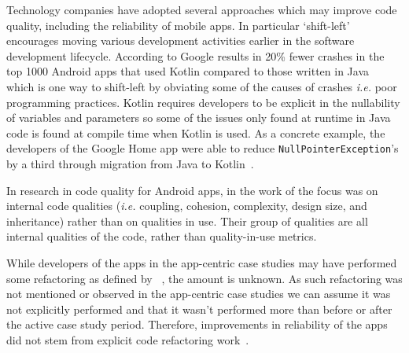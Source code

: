 Technology companies have adopted several approaches which may improve code quality, including the reliability of mobile apps. In particular `shift-left'~ encourages moving various development activities earlier in the software development lifecycle. According to Google  results in 20\% fewer crashes in the top 1000 Android apps that used Kotlin compared to those written in Java~ which is one way to shift-left by obviating some of the causes of crashes \emph{i.e.} poor programming practices. Kotlin requires developers to be explicit in the nullability of variables and parameters so some of the issues only found at runtime in Java code is found at compile time when Kotlin is used. As a concrete example, the developers of the Google Home app were able to reduce \texttt{NullPointerException}'s by a third through migration from Java to Kotlin~.


In research in code quality for Android apps, in the work of  the focus was on internal code qualities (\emph{i.e.} coupling, cohesion, complexity, design size, and inheritance) rather than on qualities in use. Their group of qualities are all internal qualities of the code, rather than quality-in-use metrics. 

While developers of the apps in the app-centric case studies may have performed some refactoring as defined by ~, the amount is unknown. As such refactoring was not mentioned or observed in the app-centric case studies we can assume it was not explicitly performed and that it wasn't performed more than before or after the active case study period. Therefore, improvements in reliability of the apps did not stem from explicit code refactoring work~.

